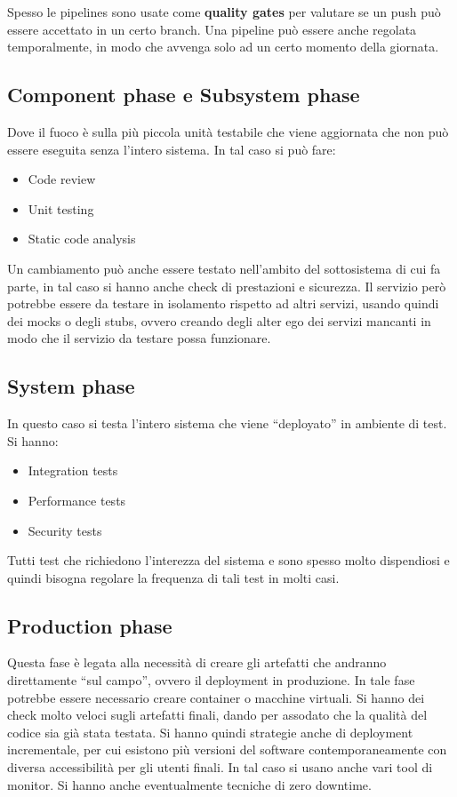 Spesso le pipelines sono usate come \textbf{quality gates} per valutare se un push
può essere accettato in un certo branch. Una pipeline può essere anche regolata
temporalmente, in modo che avvenga solo ad un certo momento della giornata.
\subsection{Component phase e Subsystem phase}
Dove il fuoco è sulla più piccola unità testabile che viene aggiornata che non
può essere eseguita senza l'intero sistema. In tal caso si può fare:
\begin{itemize}
    \item Code review
    \item Unit testing
    \item Static code analysis
\end{itemize}

Un cambiamento può anche essere testato nell'ambito del sottosistema di cui fa
parte, in tal caso si hanno anche check di prestazioni e sicurezza. Il servizio
però potrebbe essere da testare in isolamento rispetto ad altri servizi, usando quindi
dei mocks o degli stubs, ovvero creando degli alter ego dei servizi mancanti in
modo che il servizio da testare possa funzionare.
\subsection{System phase}
In questo caso si testa l'intero sistema che viene “deployato” in ambiente di test.
Si hanno:
\begin{itemize}
    \item Integration tests
    \item Performance tests
    \item Security tests
\end{itemize}

Tutti test che richiedono l'interezza del sistema e sono spesso molto dispendiosi e
quindi bisogna regolare la frequenza di tali test in molti casi.
\subsection{Production phase}
Questa fase è legata alla necessità di creare gli artefatti che andranno
direttamente “sul campo”, ovvero il deployment in produzione. In tale fase potrebbe
essere necessario creare container o macchine virtuali. Si hanno dei check molto
veloci sugli artefatti finali, dando per assodato che la qualità del codice sia già
stata testata. Si hanno quindi strategie anche di deployment incrementale, per
cui esistono più versioni del software contemporaneamente con diversa accessibilità
per gli utenti finali. In tal caso si usano anche vari tool di monitor. Si hanno
anche eventualmente tecniche di zero downtime.

